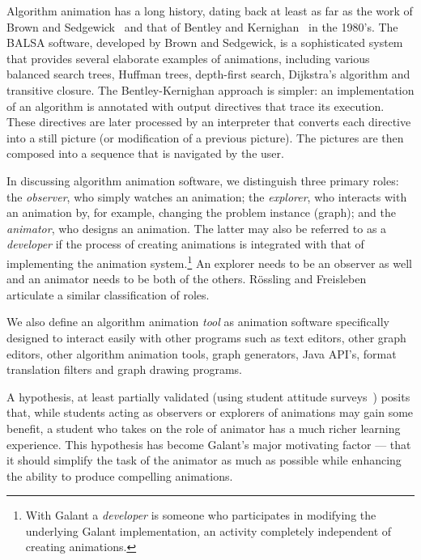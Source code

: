 Algorithm animation has a long history, dating back at least as far as the
work of Brown and Sedgewick~\cite{1988-Computer-Brown,1985-IEEE_Software-Brown}
and that of Bentley and Kernighan~\cite{1987-Animation-Bentley} in the 1980's.
The BALSA software, developed by Brown and Sedgewick, is a sophisticated system that provides several
elaborate examples of animations, including various balanced search trees,
Huffman trees, depth-first search, Dijkstra's algorithm and transitive closure.
The Bentley-Kernighan approach is simpler: an implementation of an algorithm is annotated with output directives that trace its execution.
These directives are later processed by an interpreter that
converts each directive into a still picture (or modification of a previous
picture). The pictures are then composed into a sequence that is navigated by the user.

In discussing algorithm animation software,
we distinguish three primary roles: the \emph{observer}, who simply
watches an animation; the \emph{explorer}, who interacts with an animation by,
for example, changing the problem instance (graph); and the \emph{animator}, who
designs an animation. The latter may also be referred to as a
\emph{developer} if the process of creating animations is integrated with
that of implementing the animation system.\footnote{
  With Galant a \emph{developer} is someone who participates in modifying the
  underlying Galant implementation, an activity completely independent of creating
  animations.
}
An explorer needs to be an observer as well
and an animator needs to be both of
the others.
R\"ossling and Freisleben~\cite{2002-JVLC-Roessling} articulate a similar
classification of roles.

We also define an algorithm animation \emph{tool} as animation software specifically designed to interact easily with other programs such as
text editors, other graph editors, other algorithm animation tools,
graph generators, Java API's, format translation filters and
graph drawing programs.

A hypothesis, at least partially validated (using student attitude
surveys~\cite{1997-SIGCSE-Stasko}) posits that,
while students acting as observers or explorers of animations may gain some benefit,
a student who takes on the role of animator has a much richer learning
experience.
This hypothesis has become Galant's major motivating factor --- that it should
simplify the task of the animator as much as possible while enhancing
the ability to produce compelling animations.

